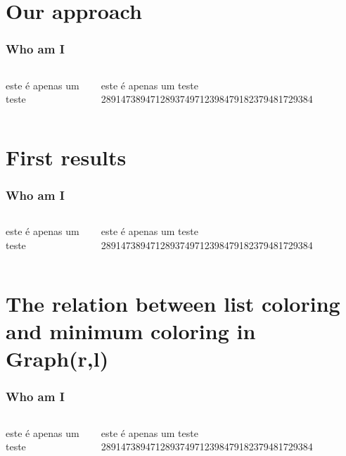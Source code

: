 \documentclass[9pt, compress]{beamer}
\begin{document}
    \section{Our approach}
    \begin{frame}
        \frametitle{Who am I}
        \begin{columns}
          \begin{column}{0.5\textwidth}
            este é apenas um teste 
          \end{column}
          \begin{column}{0.5\textwidth}
            este é apenas um teste 2891473894712893749712398479182379481729384
          \end{column}
        \end{columns}
    \end{frame}
    \section{First results}
    \begin{frame}
        \frametitle{Who am I}
        \begin{columns}
          \begin{column}{0.5\textwidth}
            este é apenas um teste 
          \end{column}
          \begin{column}{0.5\textwidth}
            este é apenas um teste 2891473894712893749712398479182379481729384
          \end{column}
        \end{columns}
    \end{frame}
    \section{The relation between list coloring and minimum coloring in Graph(r,l)}
    \begin{frame}
        \frametitle{Who am I}
        \begin{columns}
          \begin{column}{0.5\textwidth}
            este é apenas um teste 
          \end{column}
          \begin{column}{0.5\textwidth}
            este é apenas um teste 2891473894712893749712398479182379481729384
          \end{column}
        \end{columns}
    \end{frame}
\end{document}
